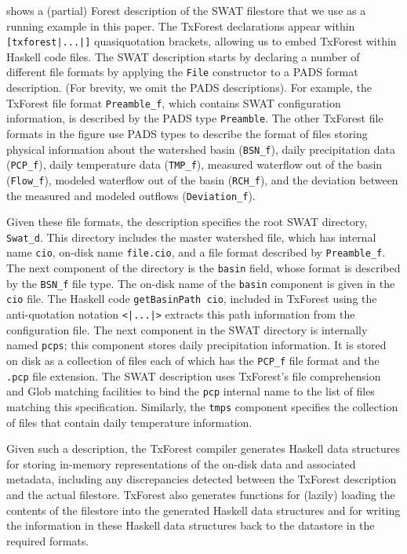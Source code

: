 shows a (partial) Forest description of the SWAT filestore that we use
as a running example in this paper.
The TxForest declarations appear within \texttt{[txforest|...|]}
quasiquotation brackets, allowing us to embed TxForest within Haskell
code files.  The SWAT description starts by declaring a number of
different file formats by applying the \texttt{File} constructor to
a PADS format description.  (For brevity, we omit the PADS
descriptions).   For example, the TxForest file format
\texttt{Preamble\_f}, which contains SWAT configuration information,
is described by the PADS type \texttt{Preamble}.
The other TxForest file formats in the figure use PADS types to
describe the format of files storing 
physical information about the watershed basin (\texttt{BSN\_f}),
daily precipitation data (\texttt{PCP\_f}),
daily temperature data (\texttt{TMP\_f}),
measured waterflow out of the basin (\texttt{Flow\_f}),
modeled waterflow out of the basin (\texttt{RCH\_f}),
and the deviation between the measured and modeled outflows (\texttt{Deviation\_f}).

Given these file formats, the description specifies the root SWAT
directory, \texttt{Swat\_d}.  This directory includes the master
watershed file, which has internal name \texttt{cio}, on-disk name
\texttt{file.cio}, and a file format described by
\texttt{Preamble\_f}.  The next component of the directory is the
\texttt{basin} field, whose format is described by the \texttt{BSN\_f}
file type.  The on-disk name of the \texttt{basin} component is given
in the \texttt{cio} file.  The Haskell code \texttt{getBasinPath cio},
included in TxForest using the anti-quotation notation
\texttt{<|...|>} extracts this path information from the configuration
file.  The next component in the SWAT directory is internally named
\texttt{pcps}; this component stores daily precipitation information.
It is stored on disk as a collection of files each of which has the
\texttt{PCP\_f} file format and the \texttt{.pcp} file extension.  The
SWAT description uses TxForest's file comprehension and Glob matching
facilities to bind the \texttt{pcp} internal name to the list of files
matching this specification.  Similarly, the \texttt{tmps} component
specifies the collection of files that contain daily temperature
information.

Given such a description, the TxForest compiler generates Haskell data
structures for storing in-memory representations of the on-disk data
and associated metadata, including any discrepancies detected between
the TxForest description and the actual filestore.  TxForest also
generates functions for (lazily) loading the contents of the filestore
into the generated Haskell data structures and for writing the
information in these Haskell data structures back to the datastore in
the required formats.

